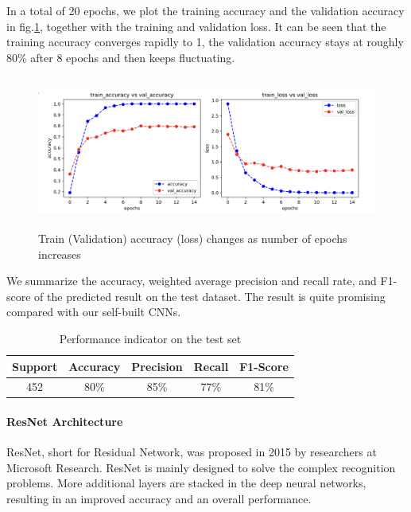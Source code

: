 In a total of 20 epochs, we plot the training accuracy and the validation accuracy in fig.\ref{pic:loss-vgg16}, together with the training and validation loss. It can be seen that the training accuracy converges rapidly to 1, the validation accuracy stays at roughly 80\% after 8 epochs and then keeps fluctuating.

\begin{figure}[H]
    \centering\includegraphics[width=16cm, height=5cm]{./figures/vgg-acc.jpg}
    \caption{Train (Validation) accuracy (loss) changes as number of epochs increases}
    \label{pic:loss-vgg16}
\end{figure}

We summarize the accuracy, weighted average precision and recall rate, and F1-score of the predicted result on the test dataset. The result is quite promising compared with our self-built CNNs. 

\begin{table}[!htbp]
    \small
	\centering
	\begin{tabularx}{0.6\textwidth}{ccccc}
		\toprule
		\textbf{Support}
       &  \textbf{Accuracy}
        & \textbf{Precision} 
        & \textbf{Recall} 
        & \textbf{F1-Score} \\

        \midrule
        452
        & 80\%
        & 85\%
        & 77\%
        & 81\%\\
		\bottomrule
	\end{tabularx}%
	\label{tab:result2}%
	\caption{Performance indicator on the test set}
\end{table}%

\paragraph{ResNet Architecture}

ResNet, short for Residual Network\cite{he2016deep}, was proposed in 2015 by researchers at Microsoft Research. ResNet is mainly designed to solve the complex recognition problems. More additional layers are stacked in the deep neural networks, resulting in an improved accuracy and an overall performance.

